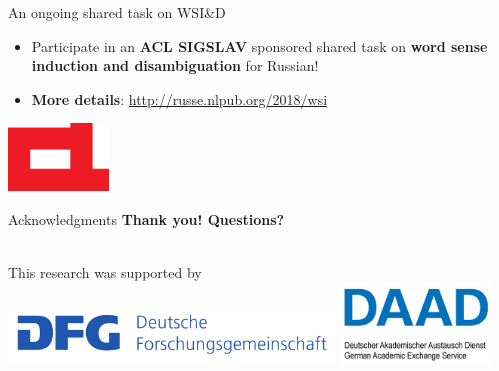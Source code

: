 \documentclass[usenames,dvipsnames]{beamer}
\begin{document}
\begin{frame}{An ongoing shared task on WSI\&D}
  
  \begin{itemize}
  \item Participate in an \textbf{\alert{ACL SIGSLAV}} sponsored shared task on \textbf{word sense induction and disambiguation} for Russian!
 \end{itemize} 
  
%  
  \begin{itemize}
    \item \textbf{More details}: \url{http://russe.nlpub.org/2018/wsi}
     
  \end{itemize}
  
  \begin{center}
  	\includegraphics[width=0.2\textwidth]{acl}
  \end{center}
\end{frame}

\begin{frame}{ Acknowledgments }
\Huge{\textbf{Thank you! \alert{Questions?}}}

\\ 

{\normalsize This research was supported by}
\includegraphics[width=0.65\textwidth]{dfg} \includegraphics[width=0.3\textwidth]{daad}

\end{frame}



\end{document}
